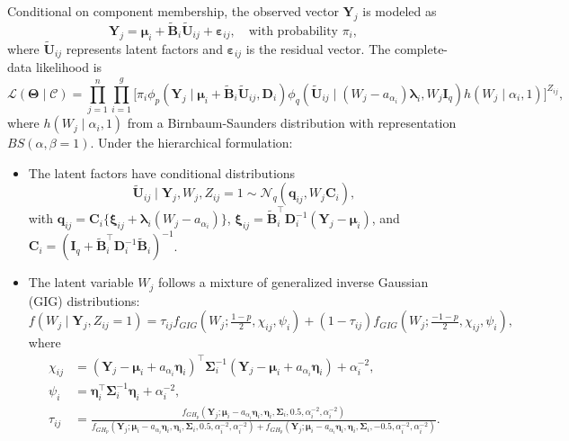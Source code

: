 \documentclass[twoside]{article}
\theoremstyle{definition}
\begin{document}
Conditional on component membership, the observed vector $\bm Y_j$ is modeled as
\[
\bm Y_j = \bm\mu_i + \tilde{\bm B}_i \tilde{\bm U}_{ij} + \bm\varepsilon_{ij}, \quad \text{with probability } \pi_i,
\]
where $\tilde{\bm U}_{ij}$ represents latent factors and $\bm \varepsilon_{ij}$ is the residual vector. The complete-data likelihood is
\[
\mathcal{L}(\bm\Theta \mid \mathcal{C}) = \prod_{j=1}^n \prod_{i=1}^g \Bigg[ \pi_i \phi_p(\bm Y_j \mid \bm\mu_i + \tilde{\bm B}_i \tilde{\bm U}_{ij}, \bm D_i) \phi_q(\tilde{\bm U}_{ij} \mid (W_j - a_{\alpha_i})\bm\lambda_i, W_j \bm I_q) h(W_j \mid \alpha_i, 1) \Bigg]^{Z_{ij}},
\]
where $h(W_j \mid \alpha_i, 1)$ from a Birnbaum-Saunders distribution with representation $ BS(\alpha,\beta=1) $. Under the hierarchical formulation:
\begin{itemize}
	\item The latent factors have conditional distributions
	\[
	\tilde{\bm U}_{ij} \mid \bm Y_j, W_j, Z_{ij}=1 \sim \mathcal{N}_q(\bm q_{ij}, W_j \bm C_i),
	\]
	with $\bm q_{ij} = \bm C_i \{\bm\xi_{ij} + \bm\lambda_i(W_j - a_{\alpha_i})\}$, $\bm\xi_{ij} = \tilde{\bm B}_i^\top \bm D_i^{-1} (\bm Y_j - \bm\mu_i)$, and $\bm C_i = (\bm I_q + \tilde{\bm B}_i^\top \bm D_i^{-1} \tilde{\bm B}_i)^{-1}$.
	
	\item The latent variable $W_j$ follows a mixture of generalized inverse Gaussian (GIG) distributions:
	\[
	f(W_j \mid \bm Y_j, Z_{ij}=1) = \tau_{ij} f_{GIG}(W_j; \tfrac{1-p}{2}, \chi_{ij}, \psi_i) + (1-\tau_{ij}) f_{GIG}(W_j; \tfrac{-1-p}{2}, \chi_{ij}, \psi_i),
	\]
	where
	\begin{align*}
		\chi_{ij} &= (\bm Y_j - \bm\mu_i + a_{\alpha_i}\bm\eta_i)^\top \bm\Sigma_i^{-1} (\bm Y_j - \bm\mu_i + a_{\alpha_i}\bm\eta_i) + \alpha_i^{-2},\\
		\psi_i &= \bm\eta_i^\top \bm\Sigma_i^{-1} \bm\eta_i + \alpha_i^{-2},\\
		\tau_{ij} &= \frac{f_{GH_p}(\bm Y_j;\bm\mu_i - a_{\alpha_i}\bm\eta_i, \bm\eta_i, \bm\Sigma_i, 0.5, \alpha_i^{-2}, \alpha_i^{-2})}{f_{GH_p}(\bm Y_j;\bm\mu_i - a_{\alpha_i}\bm\eta_i, \bm\eta_i, \bm\Sigma_i, 0.5, \alpha_i^{-2}, \alpha_i^{-2}) + f_{GH_p}(\bm Y_j;\bm\mu_i - a_{\alpha_i}\bm\eta_i, \bm\eta_i, \bm\Sigma_i, -0.5, \alpha_i^{-2}, \alpha_i^{-2})}.
	\end{align*}
	

\end{itemize}
\end{document}
